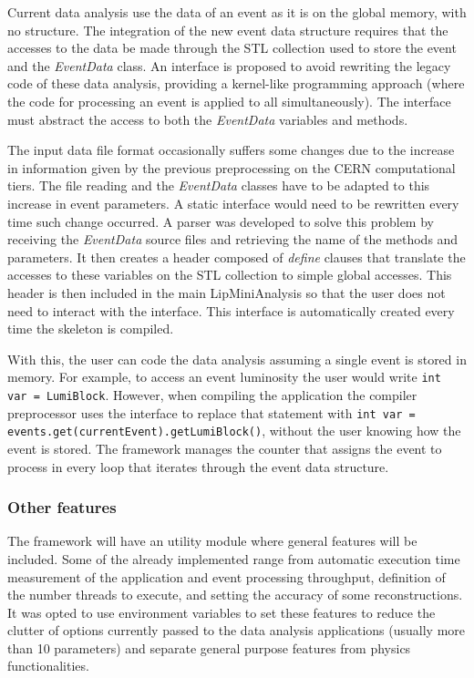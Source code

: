 Current data analysis use the data of an event as it is on the global memory, with no structure. The integration of the new event data structure requires that the accesses to the data be made through the STL collection used to store the event and the \textit{EventData} class. An interface is proposed to avoid rewriting the legacy code of these data analysis, providing a kernel-like programming approach (where the code for processing an event is applied to all simultaneously). The interface must abstract the access to both the \textit{EventData} variables and methods.

The input data file format occasionally suffers some changes due to the increase in information given by the previous preprocessing on the CERN computational tiers. The file reading and the \textit{EventData} classes have to be adapted to this increase in event parameters. A static interface would need to be rewritten every time such change occurred. A parser was developed to solve this problem by receiving the \textit{EventData} source files and retrieving the name of the methods and parameters. It then creates a header composed of \textit{define} clauses that translate the accesses to these variables on the STL collection to simple global accesses. This header is then included in the main LipMiniAnalysis so that the user does not need to interact with the interface. This interface is automatically created every time the skeleton is compiled.

With this, the user can code the data analysis assuming a single event is stored in memory. For example, to access an event luminosity the user would write \texttt{int var = LumiBlock}. However, when compiling the application the compiler preprocessor uses the interface to replace that statement with \texttt{int var = events.get(currentEvent).getLumiBlock()}, without the user knowing how the event is stored. The framework manages the counter that assigns the event to process in every loop that iterates through the event data structure.

\subsubsection*{Other features}

The framework will have an utility module where general features will be included. Some of the already implemented range from automatic execution time measurement of the application and event processing throughput, definition of the number threads to execute, and setting the accuracy of some reconstructions. It was opted to use environment variables to set these features to reduce the clutter of options currently passed to the data analysis applications (usually more than 10 parameters) and separate general purpose features from physics functionalities.

